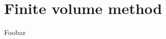 \graphicspath{{./figures/chapter3/}}
\lstset{inputpath = ../MATLAB}

\chapter{Finite volume method} \label{ch:FVM}

Foobar

